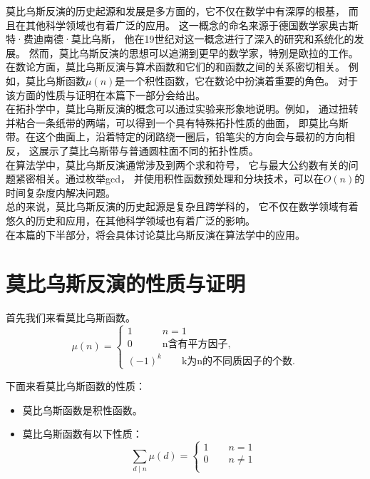 \documentclass{hfutreport}
\begin{document}
莫比乌斯反演的历史起源和发展是多方面的，它不仅在数学中有深厚的根基，
而且在其他科学领域也有着广泛的应用。
这一概念的命名来源于德国数学家奥古斯特·费迪南德·莫比乌斯，
他在19世纪对这一概念进行了深入的研究和系统化的发展。
然而，莫比乌斯反演的思想可以追溯到更早的数学家，特别是欧拉的工作。\\

在数论方面，莫比乌斯反演与算术函数和它们的和函数之间的关系密切相关。
例如，莫比乌斯函数$\mu(n)$是一个积性函数，它在数论中扮演着重要的角色。
对于该方面的性质与证明在本篇下一部分会给出。\\

在拓扑学中，莫比乌斯反演的概念可以通过实验来形象地说明。例如，
通过扭转并粘合一条纸带的两端，可以得到一个具有特殊拓扑性质的曲面，
即莫比乌斯带。在这个曲面上，沿着特定的闭路绕一圈后，铅笔尖的方向会与最初的方向相反，
这展示了莫比乌斯带与普通圆柱面不同的拓扑性质。\\

在算法学中，莫比乌斯反演通常涉及到两个求和符号，
它与最大公约数有关的问题紧密相关。通过枚举gcd，
并使用积性函数预处理和分块技术，可以在$O(n)$的时间复杂度内解决问题。\\

总的来说，莫比乌斯反演的历史起源是复杂且跨学科的，
它不仅在数学领域有着悠久的历史和应用，在其他科学领域也有着广泛的影响。\\

在本篇的下半部分，将会具体讨论莫比乌斯反演在算法学中的应用。\\

\section{莫比乌斯反演的性质与证明}
首先我们来看莫比乌斯函数。\\

\[
    \mu(n) = 
    \begin{cases}
        1 \qquad \quad n = 1 \\
        0 \qquad \quad \text{n含有平方因子}, \\
        (-1)^{k} \qquad  \text{k为n的不同质因子的个数}.
    \end{cases}  
\]

下面来看莫比乌斯函数的性质：\\
\begin{itemize}
    \item 莫比乌斯函数是积性函数。
    \item 莫比乌斯函数有以下性质：
    \[
        \sum_{d \mid n} \mu(d)  =
        \begin{cases}
            1 \qquad n=1\\
            0 \qquad n \neq 1\\
        \end{cases}
    \]
\end{itemize}
\end{document}
